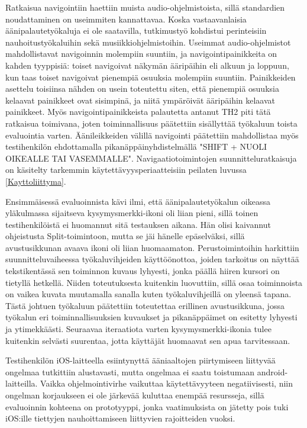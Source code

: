 \documentclass[utf8]{gradu3}
\begin{document}
Ratkaisua navigointiin haettiin muista audio-ohjelmistoista, sillä standardien noudattaminen on useimmiten kannattavaa. Koska vastaavanlaisia äänipalautetyökaluja ei ole saatavilla, tutkimustyö kohdistui perinteisiin nauhoitustyökaluihin sekä musiikkiohjelmistoihin. Useimmat audio-ohjelmistot mahdollistavat navigoinnin molempiin suuntiin, ja navigointipainikkeita on kahden tyyppisiä: toiset navigoivat näkymän ääripäihin eli alkuun ja loppuun, kun taas toiset navigoivat pienempiä osuuksia molempiin suuntiin. Painikkeiden asettelu toisiinsa nähden on usein toteutettu siten, että pienempiä osuuksia kelaavat painikkeet ovat sisimpinä, ja niitä ympäröivät ääripäihin kelaavat painikkeet. Myös navigointipainikkeista palautetta antanut TH2 piti tätä ratkaisua toimivana, joten toiminnallisuus päätettiin sisällyttää työkaluun toista evaluointia varten. Äänileikkeiden välillä navigointi päätettiin mahdollistaa myös testihenkilön ehdottamalla pikanäppäinyhdistelmällä "SHIFT + NUOLI OIKEALLE TAI VASEMMALLE". Navigaatiotoimintojen suunnitteluratkaisuja on käsitelty tarkemmin käytettävyysperiaatteisiin peilaten luvussa \ref{Kayttoliittyma}.

Ensimmäisessä evaluoinnista kävi ilmi, että äänipalautetyökalun oikeassa yläkulmassa sijaitseva kysymysmerkki-ikoni oli liian pieni, sillä toinen testihenkilöistä ei huomannut sitä testauksen aikana. Hän olisi kaivannut ohjeistusta Split-toimintoon, mutta se jäi hänelle epäselväksi, sillä avustusikkunan avaava ikoni oli liian huomaamaton. Perustoimintoihin harkittiin suunnitteluvaiheessa työkaluvihjeiden käyttöönottoa, joiden tarkoitus on näyttää tekstikentässä sen toiminnon kuvaus lyhyesti, jonka päällä hiiren kursori on tietyllä hetkellä. Niiden toteutuksesta kuitenkin luovuttiin, sillä osaa toiminnoista on vaikea kuvata muutamalla sanalla kuten työkaluvihjeillä on yleensä tapana. Tästä johtuen työkaluun päätettiin toteutettaa erillinen avustusikkuna, jossa työkalun eri toiminnallisuuksien kuvaukset ja pikanäppäimet on esitetty lyhyesti ja ytimekkäästi. Seuraavaa iteraatiota varten kysymysmerkki-ikonia tulee kuitenkin selvästi suurentaa, jotta käyttäjät huomaavat sen apua tarvitessaan.

Testihenkilön iOS-laitteella esiintynyttä ääniaaltojen piirtymiseen liittyvää ongelmaa tutkittiin alustavasti, mutta ongelmaa ei saatu toistumaan android-laitteilla. Vaikka ohjelmointivirhe vaikuttaa käytettävyyteen negatiivisesti, niin ongelman korjaukseen ei ole järkevää kuluttaa enempää resursseja, sillä evaluoinnin kohteena on prototyyppi, jonka vaatimuksista on jätetty pois tuki iOS:ille tiettyjen nauhoittamiseen liittyvien rajoitteiden vuoksi. 
\end{document}
